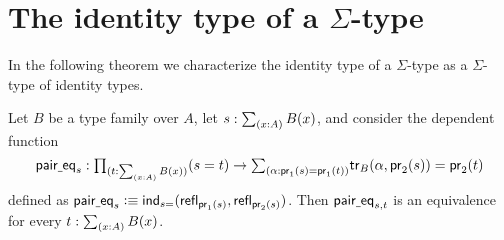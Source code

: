 \section{The identity type of a \texorpdfstring{$\Sigma$-}{dependent pair }type}

In the following theorem we characterize the identity type of a $\Sigma$-type as a $\Sigma$-type of identity types.


\begin{thm}\label{thm:eq_sigma}
Let $B$ be a type family over $A$, let $s:\sm{x:A}B(x)$, and consider the dependent function
\begin{equation*}
\mathsf{pair\usc{}eq}_{s}:\prd{t:\sm{x:A}B(x)} (s=t)\to \sm{\alpha:\proj 1(s)=\proj 1(t)} \mathsf{tr}_B(\alpha,\proj 2(s))=\proj 2(t)
\end{equation*}
defined as $\mathsf{pair\underline{\ }{}eq}_s \vcentcolon\equiv \mathsf{ind}_{s=}(\mathsf{refl}_{\mathsf{pr}_{1}(s)},\mathsf{refl}_{\mathsf{pr}_{2}(s)})$. Then $\mathsf{pair\underline{\ }{}eq}_{s,t}$ is an equivalence for every $t:\sm{x:A}B(x)$.
\end{thm}

